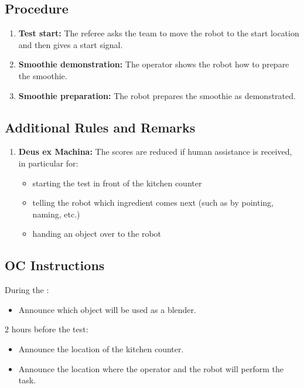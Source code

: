 \subsection*{Procedure}
\begin{enumerate}[nosep]
    \item \textbf{Test start:} The referee asks the team to move the robot to the start location and then gives a start signal.
    \item \textbf{Smoothie demonstration:} The operator shows the robot how to prepare the smoothie.
    \item \textbf{Smoothie preparation:} The robot prepares the smoothie as demonstrated.
\end{enumerate}


\subsection*{Additional Rules and Remarks}
\begin{enumerate}
	\item \textbf{Deus ex Machina:} The scores are reduced if human assistance is received, in particular for:
	\begin{itemize}[nosep]
		\item starting the test in front of the kitchen counter
		\item telling the robot which ingredient comes next (such as by pointing, naming, etc.)
		\item handing an object over to the robot
	\end{itemize}
\end{enumerate}

\subsection*{OC Instructions}
During the \SetupDays:
\begin{itemize}
	\item Announce which object will be used as a blender.
\end{itemize}
2 hours before the test:
\begin{itemize}
	\item Announce the location of the kitchen counter.
	\item Announce the location where the operator and the robot will perform the task.
\end{itemize}

